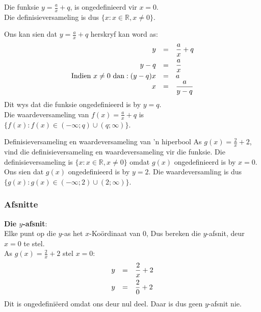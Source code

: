 Die funksie $y=\frac{a}{x}+q$, is ongedefinieerd vir $x=0$. \\
Die definisieversameling is dus $\{x:x\in \mathbb{R},x\ne 0\}$.\par 
Ons kan sien dat $y=\frac{a}{x}+q$ herskryf kan word as:
\begin{equation*}
\begin{array}{ccl}\hfill y& =& \dfrac{a}{x}+q\hfill \vspace{4pt} \\
 \hfill y-q& =& \dfrac{a}{x}\hfill \\
 \hfill \mbox{Indien }x \ne  0 ~\mbox{dan}:(y-q)x& =& a\hfill \\
 \hfill x& =& \dfrac{a}{y-q}\hfill 
\end{array}
\end{equation*}
Dit wys dat die funksie ongedefinieerd is by $y=q$. \\
Die waardeversameling van $f(x)=\frac{a}{x}+q$ is $\{f(x):f(x)\in (-\infty ;q)\cup (q;\infty )\}$.\par 

\begin{wex}{Definisieversameling en waardeversameling van 'n hiperbool}
{As $g(x)=\frac{2}{x}+2$, vind die definisieversameling en waardeversameling vir die funksie.}
{
Die definisieversameling is $\{x:x\in \mathbb{R},x\ne 0\}$ omdat $g(x)$ ongedefinieerd is by $x=0$.
Ons sien dat  $g(x)$ ongedefinieerd is by $y=2$.  Die waardeversamling is dus $\{g(x):g(x)\in (-\infty ;2)\cup (2;\infty )\}$.
}
\end{wex}


\subsubsection*{Afsnitte}

\textbf{Die $y$-afsnit}: \\
Elke punt op die $y$-as het $x$-Ko\"ordinaat van $0$, Dus bereken die $y$-afsnit, deur $x=0$ te stel.\\
As $g(x)=\frac{2}{x}+2$ stel $x=0$:
\begin{equation*}
\begin{array}{ccc}\hfill y& =& \dfrac{2}{x}+2\hfill \vspace{4pt}\\
 \hfill y& =& \dfrac{2}{0}+2\hfill 
\end{array}
\end{equation*}
Dit is ongedefiniëerd omdat ons deur nul deel. Daar is dus geen $y$-afsnit nie.\\
\\

